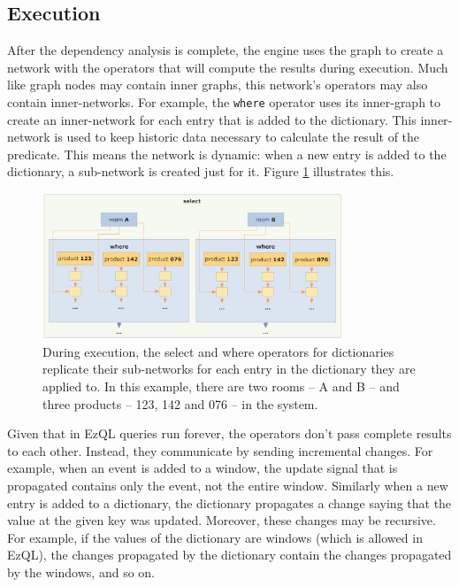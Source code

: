 \subsection{Execution}
\label{sub:execution}

After the dependency analysis is complete, the engine uses the graph
to create a network with the operators that will compute the results
during execution. Much like graph nodes may contain inner graphs, this
network's operators may also contain inner-networks. For example, the
\verb=where= operator uses its inner-graph to create an inner-network
for each entry that is added to the dictionary. This inner-network is
used to keep historic data necessary to calculate the result of the
predicate. This means the network is dynamic: when a new entry is
added to the dictionary, a sub-network is created just for it. Figure
\ref{fig:network} illustrates this.

\begin{figure} \centering
  \includegraphics[width=0.8\textwidth]{network.png}
  \caption{During execution, the select and where operators for
    dictionaries replicate their sub-networks for each entry in the
    dictionary they are applied to. In this example, there are two
    rooms -- A and B -- and three products -- 123, 142 and 076 -- in
    the system.}
  \label{fig:network}
\end{figure}


Given that in EzQL queries run forever, the operators don't pass
complete results to each other. Instead, they communicate by sending
incremental changes. For example, when an event is added to a window,
the update signal that is propagated contains only the event, not the
entire window. Similarly when a new entry is added to a dictionary,
the dictionary propagates a change saying that the value at the given
key was updated. Moreover, these changes may be recursive. For
example, if the values of the dictionary are windows (which is allowed
in EzQL), the changes propagated by the dictionary contain the changes
propagated by the windows, and so on.

